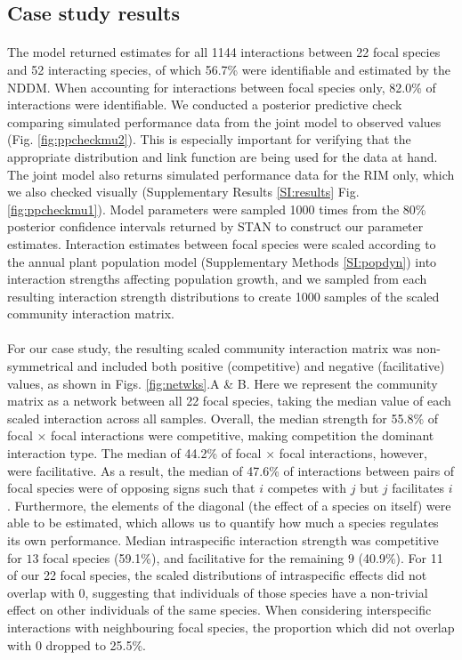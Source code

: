 \documentclass[a4,12pt]{article}
\begin{document}
\begin{refsection}
    \subsection{Case study results}

    \paragraph{}
    The model returned estimates for all 1144 interactions between 22 focal species and 52 interacting species, of which 56.7\% were identifiable and estimated by the NDDM. When accounting for interactions between focal species only, 82.0\% of interactions were identifiable. We conducted a posterior predictive check comparing simulated performance data from the joint model to observed values (Fig. \ref{fig:ppcheckmu2}). This is especially important for verifying that the appropriate distribution and link function are being used for the data at hand. The joint model also returns simulated performance data for the RIM only, which we also checked visually (Supplementary Results \ref{SI:results} Fig. \ref{fig:ppcheckmu1}). Model parameters were sampled 1000 times from the 80\% posterior confidence intervals returned by STAN to construct our parameter estimates. Interaction estimates between focal species were scaled according to the annual plant population model (Supplementary Methods \ref{SI:popdyn}) into interaction strengths affecting population growth, and we sampled from each resulting interaction strength distributions to create 1000 samples of the scaled community interaction matrix.

    \paragraph{}
    For our case study, the resulting scaled community interaction matrix was non-symmetrical and included both positive (competitive) and negative (facilitative) values, as shown in Figs. \ref{fig:netwks}.A \& B. Here we represent the community matrix as a network between all 22 focal species, taking the median value of each scaled interaction across all samples. Overall, the median strength for 55.8\% of focal $\times$ focal interactions were competitive, making competition the dominant interaction type. The median of 44.2\% of focal $\times$ focal interactions, however, were facilitative. As a result, the median of 47.6\% of interactions between pairs of focal species were of opposing signs such that $i$ competes with $j$ but $j$ facilitates $i$. Furthermore, the elements of the diagonal (the effect of a species on itself) were able to be estimated, which allows us to quantify how much a species regulates its own performance. Median intraspecific interaction strength was competitive for $13$ focal species (59.1\%), and facilitative for the remaining $9$ (40.9\%). For 11 of our 22 focal species, the scaled distributions of intraspecific effects did not overlap with $0$, suggesting that individuals of those species have a non-trivial effect on other individuals of the same species. When considering interspecific interactions with neighbouring focal species, the proportion which did not overlap with $0$ dropped to 25.5\%.


\end{refsection}
\end{document}
